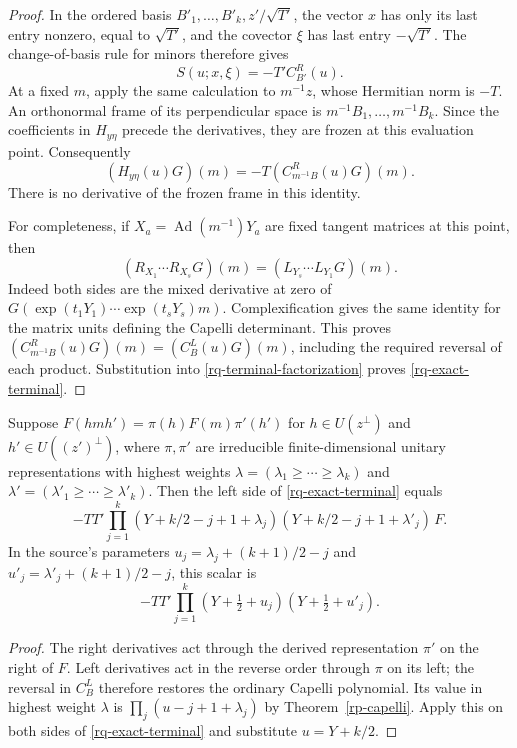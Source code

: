 \begin{proof}
In the ordered basis
$B'_1,\ldots,B'_k,z'/\sqrt{T'}$,
the vector $x$ has only its last entry nonzero,
equal to $\sqrt{T'}$, and the covector $\xi$
has last entry $-\sqrt{T'}$.
The change-of-basis rule for minors therefore gives
\[
                       S(u;x,\xi)=-T'C^R_{B'}(u).
\]
At a fixed $m$, apply the same calculation to
$m^{-1}z$, whose Hermitian norm is $-T$.
An orthonormal frame of its perpendicular space is
$m^{-1}B_1,\ldots,m^{-1}B_k$.  Since the
coefficients in $H_{y\eta}$ precede the derivatives,
they are frozen at this evaluation point.  Consequently
\[
 (H_{y\eta}(u)G)(m)
                    =-T(C^R_{m^{-1}B}(u)G)(m).
\]
There is no derivative of the frozen frame in this
identity.

For completeness, if $X_a=\operatorname{Ad}(m^{-1})Y_a$
are fixed tangent matrices at this point, then
\[
 (R_{X_1}\cdots R_{X_s}G)(m)
                       =(L_{Y_s}\cdots L_{Y_1}G)(m).
\]
Indeed both sides are the mixed derivative at zero
of
$G(\exp(t_1Y_1)\cdots\exp(t_sY_s)m)$.
Complexification gives the same identity for the
matrix units defining the Capelli determinant.
This proves
$(C^R_{m^{-1}B}(u)G)(m)=(C^L_B(u)G)(m)$,
including the required reversal of each product.
Substitution into
\eqref{rq-terminal-factorization} proves
\eqref{rq-exact-terminal}.
\end{proof}

\begin{corollary}\label{rq-type-scalar}
Suppose
$F(hmh')=\pi(h)F(m)\pi'(h')$ for
$h\in U(z^\perp)$ and $h'\in U((z')^\perp)$,
where $\pi,\pi'$ are irreducible finite-dimensional
unitary representations with highest weights
$\lambda=(\lambda_1\geq\cdots\geq\lambda_k)$ and
$\lambda'=(\lambda'_1\geq\cdots\geq\lambda'_k)$.
Then the left side of \eqref{rq-exact-terminal} equals
\[
 -TT'\prod_{j=1}^k
   (Y+k/2-j+1+\lambda_j)
   (Y+k/2-j+1+\lambda'_j)\,F.
\]
In the source's parameters
$u_j=\lambda_j+(k+1)/2-j$ and
$u'_j=\lambda'_j+(k+1)/2-j$, this scalar is
\[
                 -TT'\prod_{j=1}^k
                    (Y+\tfrac12+u_j)(Y+\tfrac12+u'_j).
\]
\end{corollary}

\begin{proof}
The right derivatives act through the derived
representation $\pi'$ on the right of $F$.
Left derivatives act in the reverse order through
$\pi$ on its left; the reversal in $C^L_B$
therefore restores the ordinary Capelli polynomial.
Its value in highest weight $\lambda$ is
$\prod_j(u-j+1+\lambda_j)$ by
Theorem~\ref{rp-capelli}.
Apply this on both sides of
\eqref{rq-exact-terminal} and substitute $u=Y+k/2$.
\end{proof}

